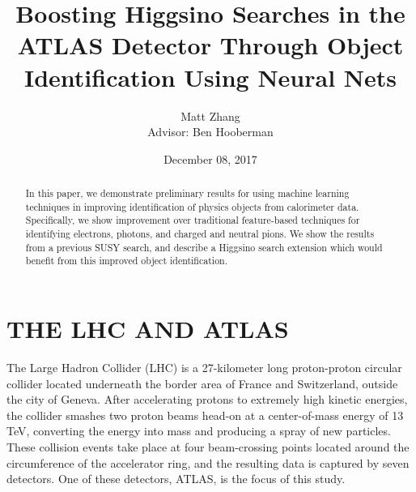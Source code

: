 \documentclass{article}
\begin{document}
\title{Boosting Higgsino Searches in the ATLAS Detector Through Object Identification Using Neural Nets}
\author{Matt Zhang \\ Advisor: Ben Hooberman}
\date{December 08, 2017}
\maketitle

\begin{abstract}
In this paper, we demonstrate preliminary results for using machine learning techniques in improving identification of physics objects from calorimeter data. Specifically, we show improvement over traditional feature-based techniques for identifying electrons, photons, and charged and neutral pions. We show the results from a previous SUSY search, and describe a Higgsino search extension which would benefit from this improved object identification.
\end{abstract}

\section*{THE LHC AND ATLAS}

The Large Hadron Collider (LHC) is a 27-kilometer long proton-proton circular collider located underneath the border area of France and Switzerland, outside the city of Geneva. After accelerating protons to extremely high kinetic energies, the collider smashes two proton beams head-on at a center-of-mass energy of 13 TeV, converting the energy into mass and producing a spray of new particles. These collision events take place at four beam-crossing points located around the circumference of the accelerator ring, and the resulting data is captured by seven detectors. One of these detectors, ATLAS, is the focus of this study.
\end{document}
